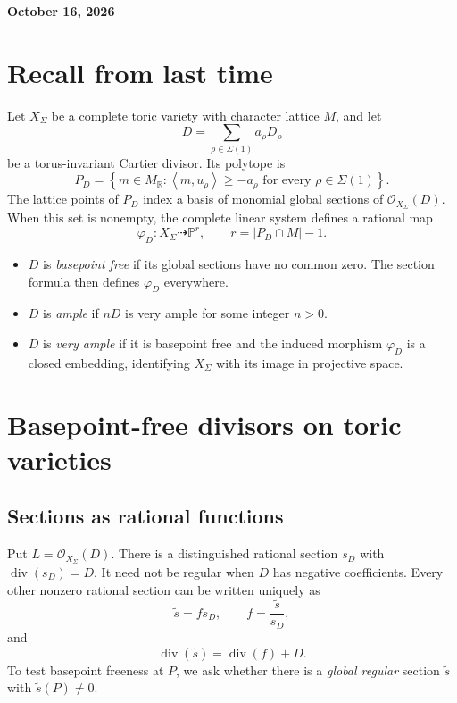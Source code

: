 \documentclass[11pt]{article}
\theoremstyle{definition}
\theoremstyle{remark}
\DeclareMathOperator{\divisor}{div}
\newcommand{\Sg}{\Sigma}
\newcommand{\cO}{\mathcal{O}}
\newcommand{\set}[1]{\left\{#1\right\}}
\newcommand{\braket}[2]{\left\langle #1,#2\right\rangle}
\newcommand{\bP}{\mathbb{P}}
\newcommand{\bR}{\mathbb{R}}
\newcommand{\vf}{\varphi}
\begin{document}
\begin{center}
    {\Large\bfseries October 16, 2026}
\end{center}

\section*{Recall from last time}

Let \(X_\Sg\) be a complete toric variety with character lattice \(M\),
and let
\[
    D=\sum_{\rho\in\Sg(1)}a_\rho D_\rho
\]
be a torus-invariant Cartier divisor. Its polytope is
\[
    P_D=\set{m\in M_\bR:\braket{m}{u_\rho}\geq-a_\rho
        \text{ for every }\rho\in\Sg(1)}.
\]
The lattice points of \(P_D\) index a basis of monomial global sections
of \(\cO_{X_\Sg}(D)\). When this set is nonempty, the complete linear
system defines a rational map
\[
    \vf_D:X_\Sg\dashrightarrow\bP^r,
    \qquad r=|P_D\cap M|-1.
\]
\begin{itemize}
    \item \(D\) is \emph{basepoint free} if its global sections have no
    common zero. The section formula then defines \(\vf_D\) everywhere.
    \item \(D\) is \emph{ample} if \(nD\) is very ample for some integer
    \(n>0\).
    \item \(D\) is \emph{very ample} if it is basepoint free and the
    induced morphism \(\vf_D\) is a closed embedding, identifying
    \(X_\Sg\) with its image in projective space.
\end{itemize}

\section{Basepoint-free divisors on toric varieties}

\subsection{Sections as rational functions}

Put \(L=\cO_{X_\Sg}(D)\). There is a distinguished rational section
\(s_D\) with \(\divisor(s_D)=D\). It need not be regular when \(D\)
has negative coefficients. Every other nonzero rational section can be written
uniquely as
\[
    \widetilde{s}=f s_D,
    \qquad f=\frac{\widetilde{s}}{s_D},
\]
and
\[
    \divisor(\widetilde{s})=\divisor(f)+D.
\]
To test basepoint freeness at \(P\), we ask whether there is a
\emph{global regular} section \(\widetilde{s}\) with
\(\widetilde{s}(P)\neq0\).
\end{document}
